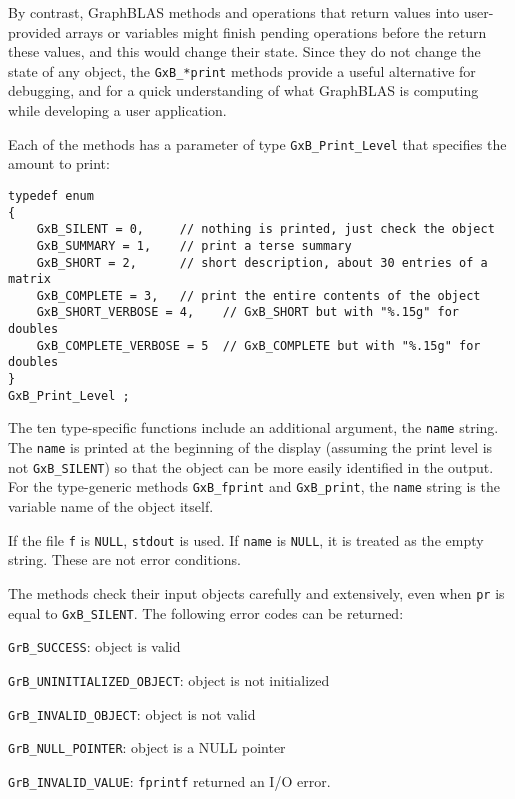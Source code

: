 \documentclass[12pt]{article}
\newenvironment{packed_itemize}{
\begin{itemize}
  \setlength{\itemsep}{1pt}
  \setlength{\parskip}{0pt}
  \setlength{\parsep}{0pt}
}{\end{itemize}}
\begin{document}
By contrast, GraphBLAS methods and operations that return values into
user-provided arrays or variables might finish pending operations before the
return these values, and this would change their state.  Since they do not
change the state of any object, the \verb'GxB_*print' methods provide a useful
alternative for debugging, and for a quick understanding of what GraphBLAS is
computing while developing a user application.

Each of the methods has a parameter of type \verb'GxB_Print_Level' that
specifies the amount to print:

{\footnotesize
\begin{verbatim}
typedef enum
{
    GxB_SILENT = 0,     // nothing is printed, just check the object
    GxB_SUMMARY = 1,    // print a terse summary
    GxB_SHORT = 2,      // short description, about 30 entries of a matrix
    GxB_COMPLETE = 3,   // print the entire contents of the object
    GxB_SHORT_VERBOSE = 4,    // GxB_SHORT but with "%.15g" for doubles
    GxB_COMPLETE_VERBOSE = 5  // GxB_COMPLETE but with "%.15g" for doubles
}
GxB_Print_Level ; \end{verbatim}}

The ten type-specific functions include an additional argument, the
\verb'name' string.  The \verb'name' is printed at the beginning of the display
(assuming the print level is not \verb'GxB_SILENT') so that the object can be
more easily identified in the output.  For the type-generic methods
\verb'GxB_fprint' and \verb'GxB_print', the \verb'name' string is the variable
name of the object itself.

If the file \verb'f' is \verb'NULL', \verb'stdout' is used.
If \verb'name' is \verb'NULL', it is treated
as the empty string.  These are not error conditions.

The methods check their input objects carefully and extensively, even when
\verb'pr' is equal to \verb'GxB_SILENT'.  The following error codes can be
returned:

\begin{packed_itemize}
\item \verb'GrB_SUCCESS':               object is valid
\item \verb'GrB_UNINITIALIZED_OBJECT':  object is not initialized
\item \verb'GrB_INVALID_OBJECT':        object is not valid
\item \verb'GrB_NULL_POINTER':          object is a NULL pointer
\item \verb'GrB_INVALID_VALUE':         \verb'fprintf' returned an I/O error.
\end{packed_itemize}
\end{document}
